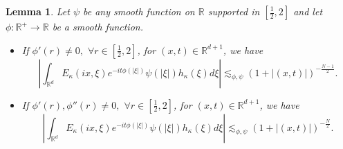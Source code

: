 \documentclass[a4paper,11pt, reqno]{amsart}
\newtheorem{lem}[theorem]{Lemma}
\theoremstyle{definition}
\theoremstyle{remark}
\numberwithin{equation}{section}
\begin{document}
	\begin{lem}\label{general case}
		  Let  $\psi$ be any smooth function on $\mathbb{R}$ supported in $[\frac{1}{2},2]$ and let $\phi: \mathbb{R}^+ \to \mathbb{R}$ be a smooth function.
			\begin{itemize}
				\item If $\phi'(r)\neq0,$ $\forall r\in [\frac{1}{2},2]$, for $(x, t) \in \mathbb{R}^{d+1}$, we have
				$$
				\left|\int_{\mathbb{R}^{d}} E_{\kappa}(ix, \xi) e^{-i t\phi(|\xi|)} \psi(|\xi|) h_\kappa(\xi)  d \xi\right| \lesssim_{\phi,\psi}
				(1+|(x, t)|)^{-\frac{N-1}{2}}.
				$$
				\item If $\phi'(r),\phi''(r)\neq0,$ $\forall r\in [\frac{1}{2},2]$, for $(x, t) \in \mathbb{R}^{d+1}$, we have
				$$
				\left|\int_{\mathbb{R}^{d}} E_{\kappa}(ix, \xi) e^{-i t\phi(|\xi|)} \psi(|\xi|) h_\kappa(\xi)  d \xi\right| \lesssim_{\phi,\psi}
				(1+|(x, t)|)^{-\frac{N}{2}}.
				$$
			\end{itemize}
	\end{lem}
\end{document}

